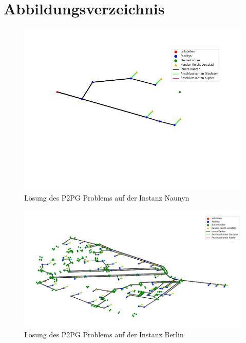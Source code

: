 \documentclass[11pt,a4paper]{article}
\theoremstyle{my_th_style1}
\begin{document}
\section*{Abbildungsverzeichnis}

\begin{figure}[!htbp]
	\begin{center}
		\begin{minipage}{10.0cm}
			\includegraphics[width=1\textwidth]{./Bilder/P2PG_Naunyn}
			\caption{Lösung des P2PG Problems auf der Instanz Naunyn}
			\label{fig:p2pg n pic}
		\end{minipage}
	\end{center}
\end{figure}

\begin{figure}[!htbp]
\begin{center}
	\begin{minipage}{15.0cm}
		\includegraphics[width=1\textwidth]{./Bilder/P2PG_Berlin}
		\caption{Lösung des P2PG Problems auf der Instanz Berlin}
		\label{p2pg b pic}
	\end{minipage}
\end{center}
\end{figure}
\end{document}
